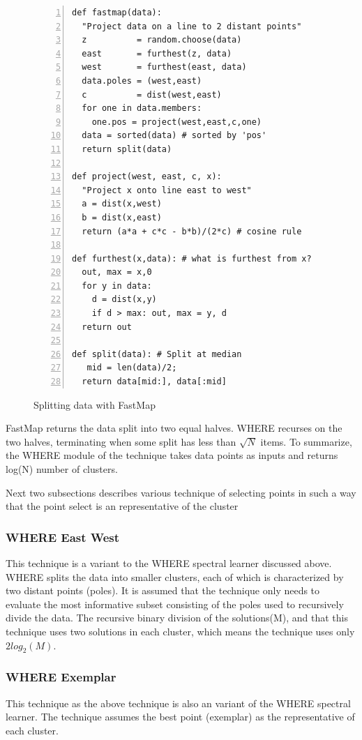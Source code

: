 \documentclass{sig-alternative}
\begin{document}
\begin{figure}[!t] 
\begin{minipage}{3.2in}
\begin{lstlisting}[mathescape,frame=l,numbers=left]
def fastmap(data): 
  "Project data on a line to 2 distant points"
  z          = random.choose(data)
  east       = furthest(z, data)
  west       = furthest(east, data)
  data.poles = (west,east)
  c          = dist(west,east)     
  for one in data.members: 
    one.pos = project(west,east,c,one)
  data = sorted(data) # sorted by 'pos'
  return split(data)

def project(west, east, c, x): 
  "Project x onto line east to west"
  a = dist(x,west)
  b = dist(x,east)
  return (a*a + c*c - b*b)/(2*c) # cosine rule

def furthest(x,data): # what is furthest from x?
  out, max = x,0
  for y in data:
    d = dist(x,y)
    if d > max: out, max = y, d
  return out

def split(data): # Split at median
   mid = len(data)/2; 
  return data[mid:], data[:mid]
\end{lstlisting}
\caption{Splitting data with FastMap}
\label{fig:fastmapCode}  
\end{minipage}
\end{figure}

FastMap returns the data split into two equal halves.
WHERE recurses on the two halves, terminating when some split has less than $\sqrt{N}$ items. To summarize, the WHERE module of the technique takes data points as inputs and returns log(N) number of clusters.

Next two subsections describes various technique of selecting points in such a way that the point select is an representative of the cluster
\subsubsection{WHERE East West}
This technique is a variant to the WHERE spectral learner discussed above. WHERE splits the data into smaller clusters, each of which is characterized by two distant points (poles). 
It is assumed  that the technique only needs to evaluate
the most informative subset consisting of the poles used to
recursively divide the data. The recursive binary division of the solutions(M), and that this technique uses two solutions in each cluster, which means the technique uses only $2log_2(M)$.

\subsubsection{WHERE Exemplar}
This technique as the above technique is also an variant of the WHERE spectral learner. The technique assumes the best point (exemplar) as the representative of each cluster. 
\end{document}
